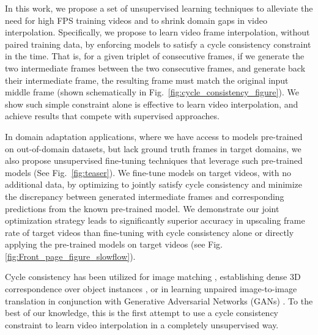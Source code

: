 \documentclass[10pt,twocolumn,letterpaper]{article}
\begin{document}
In this work, we propose a set of unsupervised learning techniques to alleviate the need for high FPS training videos and to shrink domain gaps in video interpolation. Specifically, we propose to learn video frame interpolation, without paired training data, by enforcing models to satisfy a cycle consistency  constraint \cite{brislin1970back} in the time. That is, for a given triplet of consecutive frames, if we generate the two intermediate frames between the two consecutive frames, and generate back their intermediate frame, the resulting frame must match the original input middle frame (shown schematically in Fig.~\ref{fig:cycle_consistency_figure}). We show such simple constraint alone is effective to learn video interpolation, and achieve results that compete with supervised approaches. 

In domain adaptation applications, where we have access to models pre-trained on out-of-domain datasets, but lack ground truth frames in target domains, we also propose unsupervised fine-tuning techniques that leverage such pre-trained models (See Fig.~\ref{fig:teaser}). We fine-tune models on target videos, with no additional data, by optimizing to jointly satisfy cycle consistency and minimize the discrepancy between generated intermediate frames and corresponding predictions from the known pre-trained model. We demonstrate our joint optimization strategy leads to significantly superior accuracy in upscaling frame rate of target videos than fine-tuning with cycle consistency alone or directly applying the pre-trained models on target videos (see Fig. \ref{fig:Front_page_figure_slowflow}). 

Cycle consistency has been utilized for image matching \cite{zhou2015multi}, establishing dense 3D correspondence over object instances \cite{zhou2015flowweb}, or in learning unpaired image-to-image translation in conjunction with Generative Adversarial Networks (GANs) \cite{zhu2017unpaired}. To the best of our knowledge, this is the first attempt to use a cycle consistency constraint to learn video interpolation in a completely unsupervised way. 
\end{document}
